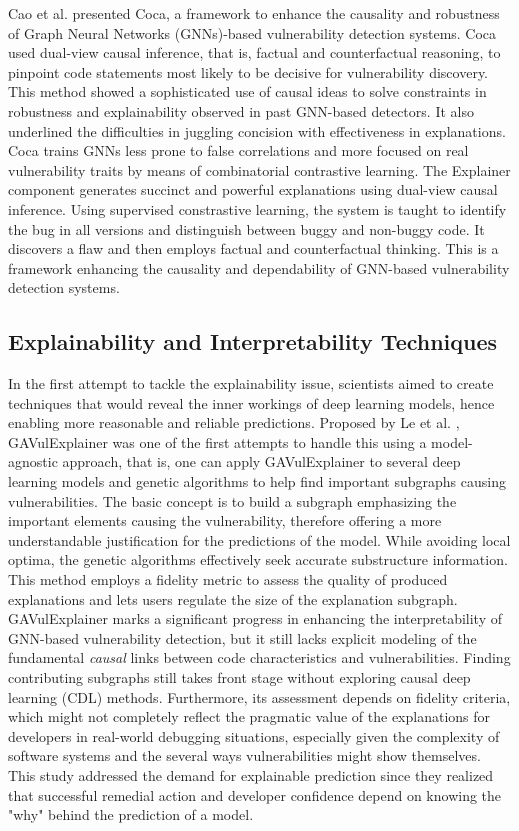 \documentclass{buthesis}
\begin{document}
Cao et al. \cite{Cao2024ICSE} presented Coca, a framework to enhance the causality and robustness of Graph Neural Networks (GNNs)-based vulnerability detection systems. Coca used dual-view causal inference, that is, factual and counterfactual reasoning, to pinpoint code statements most likely to be decisive for vulnerability discovery. This method showed a sophisticated use of causal ideas to solve constraints in robustness and explainability observed in past GNN-based detectors. It also underlined the difficulties in juggling concision with effectiveness in explanations. Coca trains GNNs less prone to false correlations and more focused on real vulnerability traits by means of combinatorial contrastive learning. The Explainer component generates succinct and powerful explanations using dual-view causal inference. Using supervised constrastive learning, the system is taught to identify the bug in all versions and distinguish between buggy and non-buggy code. It discovers a flaw and then employs factual and counterfactual thinking. This is a framework enhancing the causality and dependability of GNN-based vulnerability detection systems. 

\subsection{Explainability and Interpretability Techniques}

In the first attempt to tackle the explainability issue, scientists aimed to create techniques that would reveal the inner workings of deep learning models, hence enabling more reasonable and reliable predictions. Proposed by Le et al. \cite{li2023vulanalyzer}, GAVulExplainer was one of the first attempts to handle this using a model-agnostic approach, that is, one can apply GAVulExplainer to several deep learning models and genetic algorithms to help find important subgraphs causing vulnerabilities. The basic concept is to build a subgraph emphasizing the important elements causing the vulnerability, therefore offering a more understandable justification for the predictions of the model. While avoiding local optima, the genetic algorithms effectively seek accurate substructure information. This method employs a fidelity metric to assess the quality of produced explanations and lets users regulate the size of the explanation subgraph. GAVulExplainer marks a significant progress in enhancing the interpretability of GNN-based vulnerability detection, but it still lacks explicit modeling of the fundamental \emph{causal} links between code characteristics and vulnerabilities. Finding contributing subgraphs still takes front stage without exploring causal deep learning (CDL) methods. Furthermore, its assessment depends on fidelity criteria, which might not completely reflect the pragmatic value of the explanations for developers in real-world debugging situations, especially given the complexity of software systems and the several ways vulnerabilities might show themselves. This study addressed the demand for explainable prediction since they realized that successful remedial action and developer confidence depend on knowing the "why" behind the prediction of a model.
\end{document}
